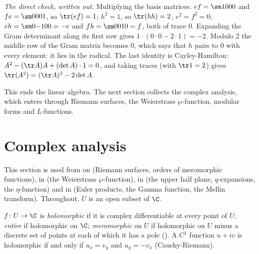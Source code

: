 \emph{The direct check, written out.} Multiplying the basis matrices: $ef=\sm1000$ and
$fe=\sm0001$, so $\tr(ef)=1$; $h^2=1$, so $\tr(hh)=2$; $e^2=f^2=0$; $eh=\sm0{-1}00=-e$ and
$fh=\sm0010=f$, both of trace $0$. Expanding the Gram determinant along its first row gives
$1\cdot(0\cdot0-2\cdot1)=-2$. Modulo $2$ the middle row of the Gram matrix becomes $0$, which says
that $h$ pairs to $0$ with every element: it lies in the radical. The last identity is
Cayley-Hamilton: $A^2-(\tr A)A+(\det A)\cdot1=0$, and taking traces (with $\tr1=2$) gives
$\tr(A^2)=(\tr A)^2-2\det A$.

This ends the linear algebra. The next section collects the complex analysis, which enters through
Riemann surfaces, the Weierstrass $\wp$-function, modular forms and $L$-functions.

\section{Complex analysis}\label{sec:prereq:complex}

This section is used from  on (Riemann surfaces, orders of meromorphic functions),
in  (the Weierstrass $\wp$-function), in  (the upper half
plane, $q$-expansions, the $\eta$-function) and in  (Euler products, the Gamma
function, the Mellin transform). Throughout, $U$ is an open subset of $\C$.

\begin{definition}\label{def:prereq:holo}
$f\colon U\to\C$ is \emph{holomorphic} if it is complex differentiable at every point of $U$;
\emph{entire} if holomorphic on $\C$; \emph{meromorphic} on $U$ if holomorphic on $U$ minus a
discrete set of points at each of which it has a pole (). A $C^1$ function
$u+iv$ is holomorphic if and only if $u_x=v_y$ and $u_y=-v_x$ (Cauchy-Riemann).
\end{definition}


